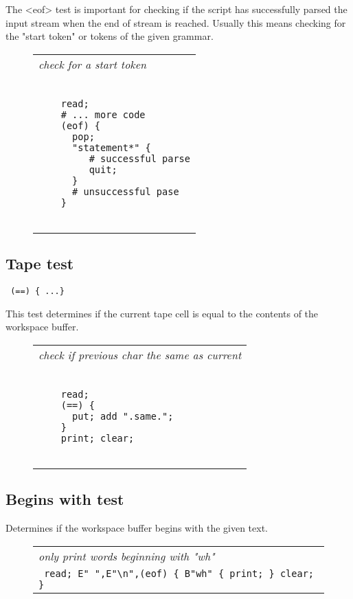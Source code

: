 \documentclass[a4paper,12pt]{article}
\begin{document}
 The <eof> test is important for checking if the script has
 successfully parsed the input stream when the end of stream is
 reached. Usually this means checking for the "start token" or tokens of the
 given grammar.
 \begin{figure}
 \begin{tabular}{ l }
 \emph{ check for a start token } \\ 
 \begin{lstlisting}[breaklines] 

    read;
    # ... more code
    (eof) {
      pop; 
      "statement*" {
         # successful parse
         quit;
      }
      # unsuccessful pase
    }
  
 \end{lstlisting} 
 \end{tabular} 

 \end{figure}

\subsection{Tape test} 
 \verb| (==) { ...} |


  This test determines if the current tape cell is equal to the
  contents of the workspace buffer.
 \begin{figure}
 \begin{tabular}{ l }
 \emph{ check if previous char the same as current } \\ 
 \begin{lstlisting}[breaklines] 

    read;  
    (==) {
      put; add ".same."; 
    }
    print; clear;
  
 \end{lstlisting} 
 \end{tabular} 

 \end{figure}

\subsection{Begins with test}

  Determines if the workspace buffer begins with the given
  text.
 \begin{figure}
 \begin{tabular}{ l }
 \emph{ only print words beginning with "wh" } \\ 
 \verb| read; E" ",E"\n",(eof) { B"wh" { print; } clear; }  |
 \end{tabular} 
 \end{figure}
\end{document}
